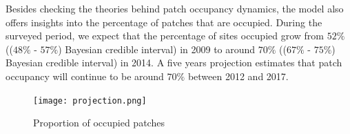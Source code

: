 \documentclass[12pt,a4paper]{article}
\begin{document}
Besides checking the theories behind patch occupancy dynamics, the model also offers insights into the percentage of patches that are occupied. During the surveyed period, we expect that the percentage of sites occupied grow from $52\%$ (($48\%$ - $57\%$) Bayesian credible interval) in 2009 to around $70\%$ (($67\%$ - $75\%$) Bayesian credible interval) in 2014. A five years projection estimates that patch occupancy will continue to be around $70\%$ between 2012 and 2017.

\begin{figure} [H]
  \begin{center}
      \texttt{[image: projection.png]}
      \label{fig:occupied patches}
      \caption{Proportion of occupied patches}
  \end{center}
\end{figure}
\end{document}
